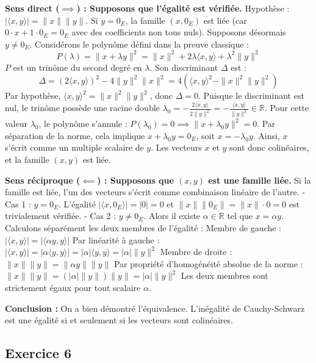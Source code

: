 \documentclass[11pt,a4paper]{report}
\begin{document}
\textbf{Sens direct ($\implies$) : Supposons que l'égalité est vérifiée.}
Hypothèse : $|\langle x, y \rangle| = \|x\| \|y\|$.
Si $y = 0_E$, la famille $(x, 0_E)$ est liée (car $0 \cdot x + 1 \cdot 0_E = 0_E$ avec des coefficients non tous nuls).
Supposons désormais $y \neq 0_E$. Considérons le polynôme défini dans la preuve classique :
$$P(\lambda) = \|x + \lambda y\|^2 = \|x\|^2 + 2\lambda\langle x, y \rangle + \lambda^2\|y\|^2$$
$P$ est un trinôme du second degré en $\lambda$. Son discriminant $\Delta$ est :
$$\Delta = (2\langle x, y \rangle)^2 - 4\|y\|^2\|x\|^2 = 4(\langle x, y \rangle^2 - \|x\|^2\|y\|^2)$$
Par hypothèse, $\langle x, y \rangle^2 = \|x\|^2\|y\|^2$, donc $\Delta = 0$.
Puisque le discriminant est nul, le trinôme possède une racine double $\lambda_0 = -\frac{2\langle x, y \rangle}{2\|y\|^2} = -\frac{\langle x, y \rangle}{\|y\|^2} \in \mathbb{R}$.
Pour cette valeur $\lambda_0$, le polynôme s'annule :
$P(\lambda_0) = 0 \implies \|x + \lambda_0 y\|^2 = 0$.
Par séparation de la norme, cela implique $x + \lambda_0 y = 0_E$, soit $x = -\lambda_0 y$.
Ainsi, $x$ s'écrit comme un multiple scalaire de $y$. Les vecteurs $x$ et $y$ sont donc colinéaires, et la famille $(x, y)$ est liée.

\textbf{Sens réciproque ($\impliedby$) : Supposons que $(x, y)$ est une famille liée.}
Si la famille est liée, l'un des vecteurs s'écrit comme combinaison linéaire de l'autre.
- Cas 1 : $y = 0_E$. L'égalité $|\langle x, 0_E \rangle| = |0| = 0$ et $\|x\|\|0_E\| = \|x\| \cdot 0 = 0$ est trivialement vérifiée.
- Cas 2 : $y \neq 0_E$. Alors il existe $\alpha \in \mathbb{R}$ tel que $x = \alpha y$.
Calculons séparément les deux membres de l'égalité :
Membre de gauche :
$|\langle x, y \rangle| = |\langle \alpha y, y \rangle|$
Par linéarité à gauche :
$|\langle x, y \rangle| = |\alpha \langle y, y \rangle| = |\alpha| \langle y, y \rangle = |\alpha| \|y\|^2$
Membre de droite :
$\|x\| \|y\| = \|\alpha y\| \|y\|$
Par propriété d'homogénéité absolue de la norme :
$\|x\| \|y\| = (|\alpha| \|y\|) \|y\| = |\alpha| \|y\|^2$
Les deux membres sont strictement égaux pour tout scalaire $\alpha$.

\textbf{Conclusion :}
On a bien démontré l'équivalence. L'inégalité de Cauchy-Schwarz est une égalité si et seulement si les vecteurs sont colinéaires.

\subsection*{Exercice 6}
\end{document}
